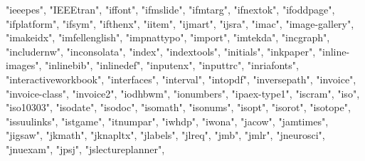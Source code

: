 \documentclass[
]{article}
\newenvironment{Shaded}{\begin{snugshade}}{\end{snugshade}}
\newcommand{\NormalTok}[1]{#1}
\newcommand{\StringTok}[1]{\textcolor[rgb]{0.31,0.60,0.02}{#1}}
\begin{document}
\begin{Shaded}
\begin{Highlighting}[]
\StringTok{"ieeepes"}\NormalTok{, }\StringTok{"IEEEtran"}\NormalTok{, }\StringTok{"iffont"}\NormalTok{, }\StringTok{"ifmslide"}\NormalTok{, }\StringTok{"ifmtarg"}\NormalTok{, }\StringTok{"ifnextok"}\NormalTok{, }
\StringTok{"ifoddpage"}\NormalTok{, }\StringTok{"ifplatform"}\NormalTok{, }\StringTok{"ifsym"}\NormalTok{, }\StringTok{"ifthenx"}\NormalTok{, }\StringTok{"iitem"}\NormalTok{, }\StringTok{"ijmart"}\NormalTok{, }
\StringTok{"ijsra"}\NormalTok{, }\StringTok{"imac"}\NormalTok{, }\StringTok{"image{-}gallery"}\NormalTok{, }\StringTok{"imakeidx"}\NormalTok{, }\StringTok{"imfellenglish"}\NormalTok{, }
\StringTok{"impnattypo"}\NormalTok{, }\StringTok{"import"}\NormalTok{, }\StringTok{"imtekda"}\NormalTok{, }\StringTok{"incgraph"}\NormalTok{, }\StringTok{"includernw"}\NormalTok{, }
\StringTok{"inconsolata"}\NormalTok{, }\StringTok{"index"}\NormalTok{, }\StringTok{"indextools"}\NormalTok{, }\StringTok{"initials"}\NormalTok{, }\StringTok{"inkpaper"}\NormalTok{, }
\StringTok{"inline{-}images"}\NormalTok{, }\StringTok{"inlinebib"}\NormalTok{, }\StringTok{"inlinedef"}\NormalTok{, }\StringTok{"inputenx"}\NormalTok{, }\StringTok{"inputtrc"}\NormalTok{, }
\StringTok{"inriafonts"}\NormalTok{, }\StringTok{"interactiveworkbook"}\NormalTok{, }\StringTok{"interfaces"}\NormalTok{, }\StringTok{"interval"}\NormalTok{, }
\StringTok{"intopdf"}\NormalTok{, }\StringTok{"inversepath"}\NormalTok{, }\StringTok{"invoice"}\NormalTok{, }\StringTok{"invoice{-}class"}\NormalTok{, }\StringTok{"invoice2"}\NormalTok{, }
\StringTok{"iodhbwm"}\NormalTok{, }\StringTok{"ionumbers"}\NormalTok{, }\StringTok{"ipaex{-}type1"}\NormalTok{, }\StringTok{"iscram"}\NormalTok{, }\StringTok{"iso"}\NormalTok{, }\StringTok{"iso10303"}\NormalTok{, }
\StringTok{"isodate"}\NormalTok{, }\StringTok{"isodoc"}\NormalTok{, }\StringTok{"isomath"}\NormalTok{, }\StringTok{"isonums"}\NormalTok{, }\StringTok{"isopt"}\NormalTok{, }\StringTok{"isorot"}\NormalTok{, }
\StringTok{"isotope"}\NormalTok{, }\StringTok{"issuulinks"}\NormalTok{, }\StringTok{"istgame"}\NormalTok{, }\StringTok{"itnumpar"}\NormalTok{, }\StringTok{"iwhdp"}\NormalTok{, }\StringTok{"iwona"}\NormalTok{, }
\StringTok{"jacow"}\NormalTok{, }\StringTok{"jamtimes"}\NormalTok{, }\StringTok{"jigsaw"}\NormalTok{, }\StringTok{"jkmath"}\NormalTok{, }\StringTok{"jknapltx"}\NormalTok{, }\StringTok{"jlabels"}\NormalTok{, }
\StringTok{"jlreq"}\NormalTok{, }\StringTok{"jmb"}\NormalTok{, }\StringTok{"jmlr"}\NormalTok{, }\StringTok{"jneurosci"}\NormalTok{, }\StringTok{"jnuexam"}\NormalTok{, }\StringTok{"jpsj"}\NormalTok{, }\StringTok{"jslectureplanner"}\NormalTok{, }

\end{Highlighting}
\end{Shaded}
\end{document}
